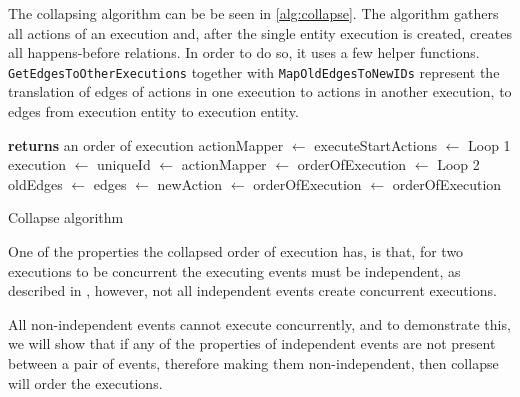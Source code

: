	\newpar The collapsing algorithm can be be seen in \autoref{alg:collapse}. The algorithm gathers all actions of an execution and, after the single entity execution is created, creates all happens-before relations. In order to do so, it uses a few helper functions. \texttt{GetEdgesToOtherExecutions} together with \texttt{MapOldEdgesToNewIDs} represent the translation of edges of actions in one execution to actions in another execution, to edges from execution entity to execution entity.
	
	\begin{algorithm}[H]
		\begin{algorithmic}
			 \textbf{returns} an order of execution \State
			actionMapper $\leftarrow$ 
			\State executeStartActions $\leftarrow$ 
			\State
				\Comment Loop 1
				\State execution $\leftarrow$ 
				\State uniqueId $\leftarrow$ 
				\State
					actionMapper $\leftarrow$  
				\EndFor
			\EndFor
			\State
			\State orderOfExecution $\leftarrow$ 
			\State
				\Comment Loop 2
				\State oldEdges $\leftarrow$ 
				\State edges $\leftarrow$ 
				\State newAction $\leftarrow$ 
			\State
			orderOfExecution $\leftarrow$  \State{}
			\EndFor\State
			\Return orderOfExecution
			\EndFunction
		\end{algorithmic}
		\caption{Collapse algorithm}
		\label{alg:collapse}
	\end{algorithm}
	
	\noindent One of the properties the collapsed order of execution has, is that, for two executions to be concurrent the executing events must be independent, as described in \cite{debois2015concurrency}, however, not all independent\- events create concurrent executions.
	
	All non-independent events cannot execute concurrently, and to demonstrate this, we will show that if any of the properties of independent events are not present between a pair of events, therefore making them non-independent, then collapse will order the executions.
	
